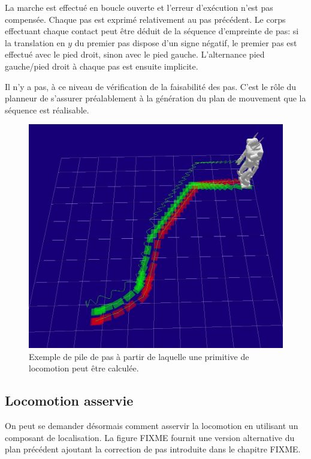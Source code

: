 La marche est effectué en boucle ouverte et l'erreur d'exécution n'est
pas compensée. Chaque pas est exprimé relativement au pas
précédent. Le corps effectuant chaque contact peut être déduit de la
séquence d'empreinte de pas: si la translation en $y$ du premier pas
dispose d'un signe négatif, le premier pas est effectué avec le pied
droit, sinon avec le pied gauche. L'alternance pied gauche/pied droit
à chaque pas est ensuite implicite.


Il n'y a pas, à ce niveau de vérification de la faisabilité des
pas. C'est le rôle du planneur de s'assurer préalablement à la
génération du plan de mouvement que la séquence est réalisable.

\begin{figure}
  \begin{center}
    \includegraphics[width=.95\linewidth]{src/chap3-primitive-mouvement/footsteps1.jpg}
  \end{center}
  \caption{Exemple de pile de pas à partir de laquelle une primitive
    de locomotion peut être calculée.}
\end{figure}


\FloatBarrier

\subsection{Locomotion asservie}

On peut se demander désormais comment asservir la locomotion en
utilisant un composant de localisation. La figure FIXME fournit une
version alternative du plan précédent ajoutant la correction de pas
introduite dans le chapitre FIXME.

